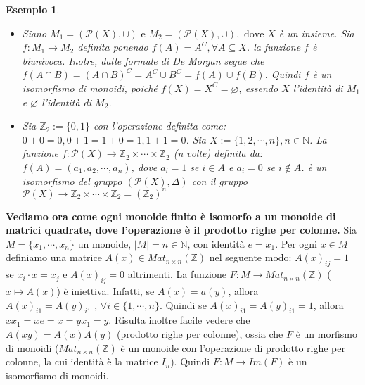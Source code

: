 \documentclass[a4paper,12pt]{article}
\theoremstyle{def}
\theoremstyle{prop}
\theoremstyle{esempio}
\newtheorem*{example}{Esempio}
\theoremstyle{dimostrazione}
\theoremstyle{teo}
\theoremstyle{osservazione}
\begin{document}
\begin{example}
	\
	\begin{itemize}
		\item Siano \(M_1 = (\mathcal{P}(X), \cup) \text{ e } M_2 = (\mathcal{P}(X), \cup), \text{ dove } X\)
		      è un insieme. Sia \(f : M_1 \rightarrow M_2\) definita ponendo \(f(A) = A^C , \forall A \subseteq X\).
		      la funzione \(f\) è biunivoca. Inotre, dalle formule di De Morgan segue che \(f(A \cap B) =
		      (A \cap B)^C = A^C \cup B^C = f(A) \cup f(B)\). Quindi \(f\) è un isomorfismo di monoidi, poiché
		      \(f(X) = X^C = \varnothing\), essendo \(X\) l'identità di \(M_1\) e \(\varnothing\) l'identità di \(M_2\).
		\item Sia \(\mathbb{Z}_2 := \{0,1\}\) con l'operazione definita come: \(0+0=0, 0+1=1+0=1, 1+1=0\).
		      Sia \(X := \{1,2,\cdots,n\}, n \in \mathbb{N}\). La funzione \(f: \mathcal{P}(X) \rightarrow
		      \mathbb{Z}_2 \times \cdots \times \mathbb{Z}_2\) (n volte) definita da: \(f(A) = (a_1,a_2,\cdots,a_n)\),
		      dove \(a_i = 1\) se \(i \in A\) e \(a_i = 0\) se \(i \notin A\). \newline è un isomorfismo del gruppo
		      \((\mathcal{P}(X), \Delta)\) con il gruppo \(\mathcal{P}(X) \rightarrow \mathbb{Z}_2 \times \cdots
		      \times \mathbb{Z}_2 = (\mathbb{Z}_2)^n\)
	\end{itemize}
\end{example}

\textbf{Vediamo ora come ogni monoide finito è isomorfo a un monoide di matrici quadrate, dove l'operazione
	è il prodotto righe per colonne.}\newline
Sia \(M=\{x_1,\cdots,x_n\}\) un monoide, \(|M|=n \in \mathbb{N}\), con identità \(e = x_1\). Per ogni \(x \in
M\) definiamo una matrice \(A(x) \in Mat_{n \times n}(\mathbb{Z})\) nel seguente modo: \(A(x)_{ij} = 1\)
se \(x_i \cdot x = x_j\) e \(A(x)_{ij} = 0\) altrimenti. La funzione \(F : M \rightarrow Mat_{n \times n}
(\mathbb{Z})\) (\(x \mapsto A(x)\)) è iniettiva.\newline
Infatti, se \(A(x) = a(y)\), allora \(A(x)_{i1} = A(y)_{i1} \text{ , } \forall i \in \{1,\cdots,n\}\).\newline
Quindi se \(A(x)_{i1} = A(y)_{i1} = 1\), allora \(xx_1 = xe = x = yx_1 = y\).\newline
Risulta inoltre facile vedere che \(A(xy) = A(x)A(y)\) (prodotto righe per colonne), ossia che \(F\) è
un morfismo di monoidi (\(Mat_{n \times n}(\mathbb{Z})\) è un monoide con l'operazione di
prodotto righe per colonne, la cui identità è la matrice \(I_n\)).\newline
Quindi \(F: M \rightarrow Im(F)\) è un isomorfismo di monoidi.
\end{document}
